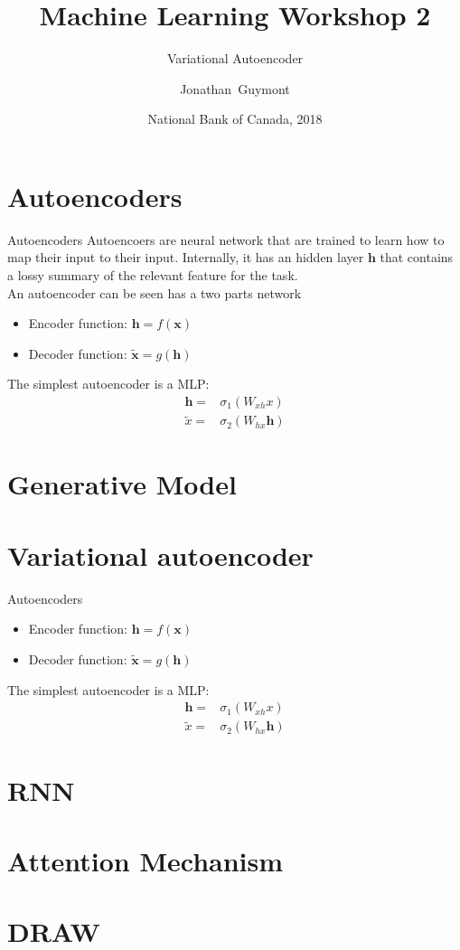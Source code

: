 \documentclass{beamer}
\title{Machine Learning Workshop 2}
\subtitle{Variational Autoencoder}
\author{Jonathan~Guymont}
\date{National Bank of Canada, 2018}
\begin{document}
\section{Autoencoders}

\begin{frame}{Autoencoders}
Autoencoers are neural network that are trained to learn how to map their input to their input. Internally, it has an hidden layer $\bm{h}$ that contains a lossy summary of the relevant feature for the task.\\

An autoencoder can be seen has a two parts network
\begin{itemize}
	\item Encoder function: $\bm{h}=f(\bm{x})$
	\item Decoder function: $\tilde{\bm{x}} = g(\bm{h})$
\end{itemize}

The simplest autoencoder is a MLP:
\begin{equation}
\begin{split}
\bm{h} =& \sigma_1\left(W_{xh}x\right)\\
\tilde{x} =& \sigma_2\left(W_{hx}\bm{h}\right) 
\end{split}
\end{equation}
\end{frame}
 
\section{Generative Model}

\section{Variational autoencoder}
\begin{frame}{Autoencoders}

\begin{itemize}
	\item Encoder function: $\bm{h}=f(\bm{x})$
	\item Decoder function: $\tilde{\bm{x}} = g(\bm{h})$
\end{itemize}

The simplest autoencoder is a MLP:
\begin{equation}
\begin{split}
\bm{h} =& \sigma_1\left(W_{xh}x\right)\\
\tilde{x} =& \sigma_2\left(W_{hx}\bm{h}\right) 
\end{split}
\end{equation}
\end{frame}

\section{RNN}

\section{Attention Mechanism}

\section{DRAW}
\end{document}

